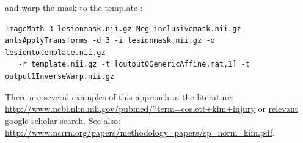 \documentclass{InsightArticle}
\begin{document}
and warp the mask to the template :
\begin{verbatim}
ImageMath 3 lesionmask.nii.gz Neg inclusivemask.nii.gz
antsApplyTransforms -d 3 -i lesionmask.nii.gz -o lesiontotemplate.nii.gz 
   -r template.nii.gz -t [output0GenericAffine.mat,1] -t output1InverseWarp.nii.gz
\end{verbatim}
There are several examples of this approach in the literature:
\href{http://www.ncbi.nlm.nih.gov/pubmed/?term=coslett+kim+injury}{http://www.ncbi.nlm.nih.gov/pubmed/?term=coslett+kim+injury}
or
\href{http://scholar.google.com/scholar?q=brain+normalization+MRI+ANTs+advanced+lesion+tools+-ant&btnG=&hl=en&as_sdt=0%2C39}{relevant google-scholar search}.
See also: \href{http://www.ncrrn.org/papers/methodology\_papers/sp\_norm\_kim.pdf}{http://www.ncrrn.org/papers/methodology\_papers/sp\_norm\_kim.pdf}.
\end{document}
